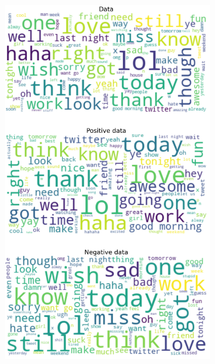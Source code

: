 \documentclass{article}
\begin{document}
\begin{itemize}
\begin{figure}[H]
\begin{subfigure}[b]{0.24\textwidth}
      \includegraphics[width=\textwidth]{chapter-06/section-01-01/08/visualization/3/wordcloud.png}
    \end{subfigure}
    \begin{subfigure}[b]{0.24\textwidth}
      \centering

\end{subfigure}
\end{figure}
\end{itemize}
\end{document}
